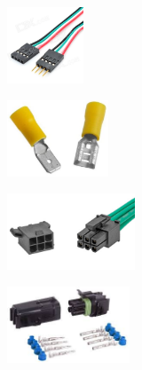 \begin{figure}[H]
\begin{subfigure}[b]{.24\linewidth}
\includegraphics[height=0.9in]{imgs/connector_headers.jpeg}
\end{subfigure}\begin{subfigure}[b]{.24\linewidth}
\includegraphics[height=0.9in]{imgs/connector_tabbed.png}
\end{subfigure}\begin{subfigure}[b]{.24\linewidth}
\includegraphics[height=0.9in]{imgs/connector_minifit.jpeg}
\end{subfigure}\begin{subfigure}[b]{.24\linewidth}
\includegraphics[height=0.9in]{imgs/connector_weatherpack.jpeg}
\end{subfigure}


\end{figure}
